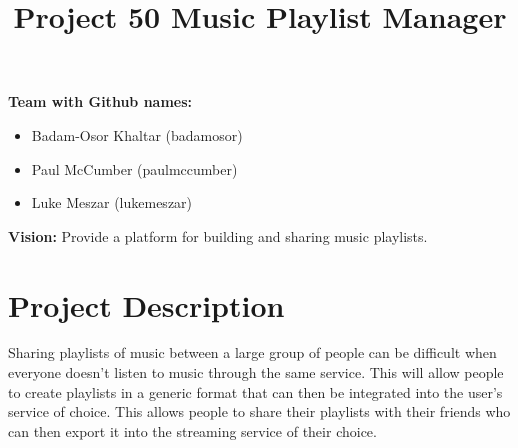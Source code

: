 \documentclass[12pt]{article}
\title{Project 50 Music Playlist Manager}
\date{}
\begin{document}
	\maketitle
	\noindent
	\textbf{Team with Github names:}
	\begin{itemize}[leftmargin=0.0cm,labelsep=0.2cm]
		\item[] Badam-Osor Khaltar (badamosor)
		\item[] Paul McCumber (paulmccumber)
		\item[] Luke Meszar (lukemeszar)
	\end{itemize}
	\textbf{Vision:} Provide a platform for building and sharing music playlists.
	\section{Project Description}
	Sharing playlists of music between a large group of people can be difficult when
	everyone doesn't listen to music through the same service. This will allow people to create
	playlists in a generic format that can then be integrated into the user’s service of choice. This allows people to share their playlists with their friends who can then export it into the streaming service of their choice. 
\end{document}
